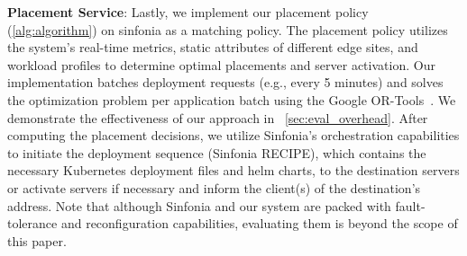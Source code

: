 \noindent\textbf{Placement Service}:
Lastly, we implement our placement policy (\autoref{alg:algorithm}) on sinfonia as a matching policy. The placement policy utilizes the system's real-time metrics, static attributes of different edge sites, and workload profiles to determine optimal placements and server activation.
Our implementation batches deployment requests (e.g., every 5 minutes) and solves the optimization problem per application batch using the Google OR-Tools~\cite{ortools}. We demonstrate the effectiveness of our approach in ~\autoref{sec:eval_overhead}. 
After computing the placement decisions, we utilize Sinfonia's orchestration capabilities to initiate the deployment sequence (Sinfonia RECIPE), which contains the necessary Kubernetes deployment files and helm charts, to the destination servers or activate servers if necessary and inform the client(s) of the destination's address. Note that although Sinfonia and our system are packed with fault-tolerance and reconfiguration capabilities, evaluating them is beyond the scope of this paper.










